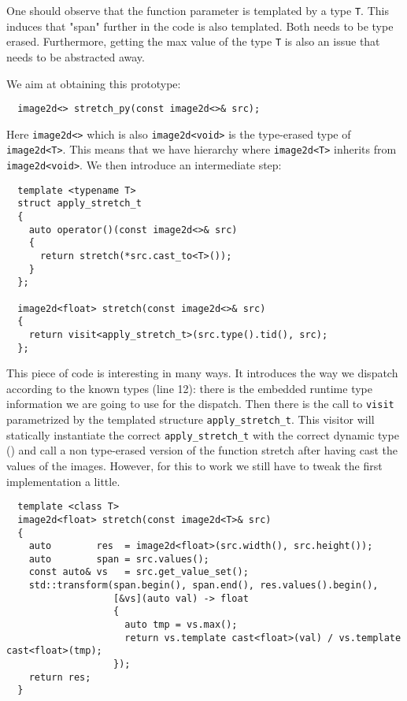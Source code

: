 One should observe that the function parameter is templated by a type \texttt{T}. This induces that "span" further in
the code is also templated. Both needs to be type erased. Furthermore, getting the max value of the type \texttt{T} is
also an issue that needs to be abstracted away.

We aim at obtaining this prototype:

\begin{verbatim}
  image2d<> stretch_py(const image2d<>& src);
\end{verbatim}

Here \texttt{image2d<>} which is also \texttt{image2d<void>} is the type-erased type of \texttt{image2d<T>}. This means
that we have hierarchy where \texttt{image2d<T>} inherits from \texttt{image2d<void>}. We then introduce an intermediate
step:

\begin{verbatim}
  template <typename T>
  struct apply_stretch_t
  {
    auto operator()(const image2d<>& src)
    {
      return stretch(*src.cast_to<T>());
    }
  };

  image2d<float> stretch(const image2d<>& src)
  {
    return visit<apply_stretch_t>(src.type().tid(), src);
  };
\end{verbatim}

This piece of code is interesting in many ways. It introduces the way we dispatch according to the known types (line
12): there is the embedded runtime type information we are going to use for the dispatch. Then there is the call to
\texttt{visit} parametrized by the templated structure \texttt{apply\_stretch\_t}. This visitor will statically
instantiate the correct \texttt{apply\_stretch\_t} with the correct dynamic type () and call a
non type-erased version of the function stretch after having cast the values of the images. However, for this to work we
still have to tweak the first implementation a little.

\begin{verbatim}
  template <class T>
  image2d<float> stretch(const image2d<T>& src)
  {
    auto        res  = image2d<float>(src.width(), src.height());
    auto        span = src.values();
    const auto& vs   = src.get_value_set();
    std::transform(span.begin(), span.end(), res.values().begin(),
                   [&vs](auto val) -> float
                   {
                     auto tmp = vs.max();
                     return vs.template cast<float>(val) / vs.template cast<float>(tmp);
                   });
    return res;
  }
\end{verbatim}

